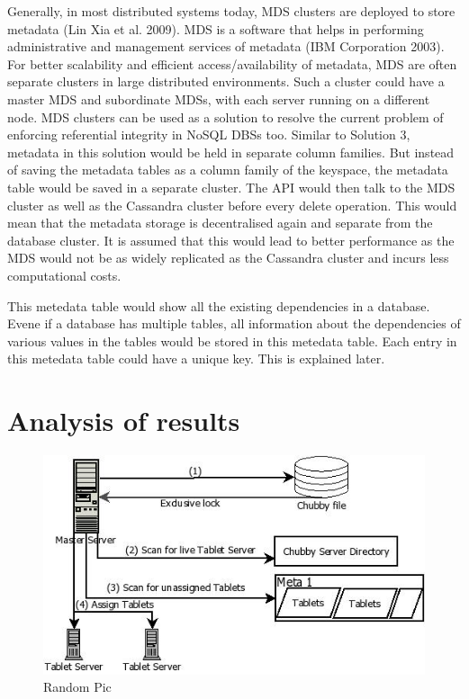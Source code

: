 Generally, in most distributed systems today, MDS clusters are deployed to store
metadata (Lin Xia et al. 2009). MDS is a software that helps in performing
administrative and management services of metadata (IBM Corporation 2003). For
better scalability and efficient access/availability of metadata, MDS are often
separate clusters in large distributed environments. Such a cluster could have
a master MDS and subordinate MDSs, with each server running on a different node.
MDS clusters can be used as a solution to resolve the current problem of
enforcing referential integrity in NoSQL DBSs too. Similar to Solution 3,
metadata in this solution would be held in separate column families. But instead
of saving the metadata tables as a column family of the keyspace, the metadata
table would be saved in a separate cluster. The API would then talk to the MDS
cluster as well as the Cassandra cluster before every delete operation.
This would mean that the metadata storage is decentralised again and separate
from the database cluster. It is assumed that this would lead to better
performance as the MDS would not be as widely replicated as the Cassandra
cluster and incurs less computational costs.


This metedata table would show all the existing dependencies in a database.
Evene if a database has multiple tables, all information about the dependencies
of various values in the tables would be stored in this metedata table. Each
entry in this metedata table could have a unique key. This is explained later.

\section{Analysis of results}\label{s:summary}

\begin{figure}
	\centering
	\includegraphics[width=.5\textwidth]{./figure/random.jpg}
	\caption{Random Pic}\label{f:random-pic}
\end{figure}
